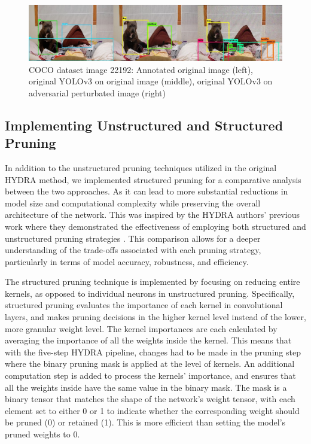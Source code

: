 \documentclass[journal,onecolumn,12pt]{IEEEtran}
\begin{document}
\begin{figure}
    \centering
    \captionsetup{justification=centering}
    \includegraphics[width=1.0\linewidth]{figures/dog1.jpg}
    \caption{COCO dataset image 22192: Annotated original image (left), original YOLOv3 on original image (middle), original YOLOv3 on adversarial perturbated image (right) }
    \label{fig:dog1}
\end{figure}

\subsection{Implementing Unstructured and Structured Pruning}
In addition to the unstructured pruning techniques utilized in the original HYDRA method, we implemented structured pruning for a comparative analysis between the two approaches. As it can lead to more substantial reductions in model size and computational complexity while preserving the overall architecture of the network. This was inspired by the HYDRA authors' previous work where they demonstrated the effectiveness of employing both structured and unstructured pruning strategies \cite{beforehydra}. This comparison allows for a deeper understanding of the trade-offs associated with each pruning strategy, particularly in terms of model accuracy, robustness, and efficiency.

The structured pruning technique is implemented by focusing on reducing entire kernels, as opposed to individual neurons in unstructured pruning. Specifically, structured pruning evaluates the importance of each kernel in convolutional layers, and makes pruning decisions in the higher kernel level instead of the lower, more granular weight level. The kernel importances are each calculated by averaging the importance of all the weights inside the kernel. This means that with the five-step HYDRA pipeline, changes had to be made in the pruning step where the binary pruning mask is applied at the level of kernels. An additional computation step is added to process the kernels' importance, and ensures that all the weights inside have the same value in the binary mask. The mask is a binary tensor that matches the shape of the network's weight tensor, with each element set to either 0 or 1 to indicate whether the corresponding weight should be pruned (0) or retained (1). This is more efficient than setting the model's pruned weights to 0.
\end{document}
